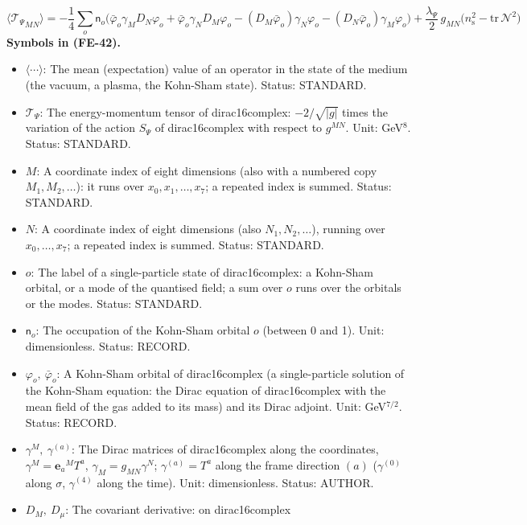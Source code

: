 \documentclass[
  10pt,
]{article}
\providecommand{\tightlist}{%
  \setlength{\itemsep}{0pt}\setlength{\parskip}{0pt}}
\begin{document}
\[
\langle{\mathcal{T}_\Psi}_{MN}\rangle = -\frac14\sum_o\mathsf{n}_o\Big(\bar\varphi_o\gamma_MD_N\varphi_o + \bar\varphi_o\gamma_ND_M\varphi_o
 - (D_M\bar\varphi_o)\gamma_N\varphi_o - (D_N\bar\varphi_o)\gamma_M\varphi_o\Big) + \frac{\lambda_\Psi}{2}\,g_{MN}\big(n_{\mathrm{s}}^2 - \mathrm{tr}\,\mathcal{N}^2\big) \tag{FE-42}
\] \textbf{Symbols in (FE-42).}

\begin{itemize}
\tightlist
\item
  \(\langle\cdots\rangle\): The mean (expectation) value of an operator
  in the state of the medium (the vacuum, a plasma, the Kohn-Sham
  state). Status: STANDARD.
\item
  \(\mathcal{T}_\Psi\): The energy-momentum tensor of dirac16complex:
  \(-2/\sqrt{\lvert g\rvert}\) times the variation of the action
  \(S_\Psi\) of dirac16complex with respect to \(g^{MN}\). Unit:
  GeV\(^8\). Status: STANDARD.
\item
  \(M\): A coordinate index of eight dimensions (also with a numbered
  copy \(M_1, M_2, \dots\)): it runs over \(x_0, x_1, \dots, x_7\); a
  repeated index is summed. Status: STANDARD.
\item
  \(N\): A coordinate index of eight dimensions (also
  \(N_1, N_2, \dots\)), running over \(x_0, \dots, x_7\); a repeated
  index is summed. Status: STANDARD.
\item
  \(o\): The label of a single-particle state of dirac16complex: a
  Kohn-Sham orbital, or a mode of the quantised field; a sum over \(o\)
  runs over the orbitals or the modes. Status: STANDARD.
\item
  \(\mathsf{n}_o\): The occupation of the Kohn-Sham orbital \(o\)
  (between 0 and 1). Unit: dimensionless. Status: RECORD.
\item
  \(\varphi_o,\ \bar\varphi_o\): A Kohn-Sham orbital of dirac16complex
  (a single-particle solution of the Kohn-Sham equation: the Dirac
  equation of dirac16complex with the mean field of the gas added to its
  mass) and its Dirac adjoint. Unit: GeV\(^{7/2}\). Status: RECORD.
\item
  \(\gamma^M,\ \gamma^{(a)}\): The Dirac matrices of dirac16complex
  along the coordinates, \(\gamma^M = \mathbf{e}_a{}^MT^a\),
  \(\gamma_M = g_{MN}\gamma^N\); \(\gamma^{(a)} = T^a\) along the frame
  direction \((a)\) (\(\gamma^{(0)}\) along \(\sigma\), \(\gamma^{(4)}\)
  along the time). Unit: dimensionless. Status: AUTHOR.
\item
  \(D_M,\ D_\mu\): The covariant derivative: on dirac16complex

\end{itemize}
\end{document}
